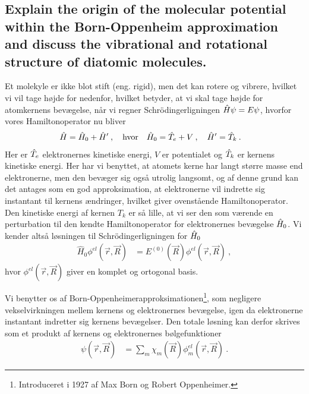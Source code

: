 \subsection{Explain the origin of the molecular potential within the Born-Oppenheim approximation and discuss the vibrational and rotational structure of diatomic molecules.}


Et molekyle er ikke blot stift (eng. rigid), men det kan rotere og vibrere, hvilket vi vil tage højde for nedenfor, hvilket betyder, at vi skal tage højde for atomkernens bevægelse, når vi regner Schrödingerligningen $\Hat{H}\psi = E \psi$, hvorfor vores Hamiltonoperator nu bliver
\begin{align}
    \Hat{H} &= \Hat{H}_0 + \Hat{H}' \: , \quad \text{hvor} \quad \Hat{H}_0 = \Hat{T}_e + V \: , \quad \Hat{H}' = \Hat{T}_k \: .
\end{align}
Her er $\Hat{T}_e$ elektronernes kinetiske energi, $V$ er potentialet og $\Hat{T}_k$ er kernens kinetiske energi. Her har vi benyttet, at atomets kerne har langt større masse end elektronerne, men den bevæger sig også utrolig langsomt, og af denne grund kan det antages som en god approksimation, at elektronerne vil indrette sig instantant til kernens ændringer, hvilket giver ovenstående Hamiltonoperator. Den kinetiske energi af kernen $T_k$ er så lille, at vi ser den som værende en perturbation til den kendte Hamiltonoperator for elektronernes bevægelse $\Hat{H}_0$.
Vi kender altså løsningen til Schrödingerligningen for $\Hat{H}_0$
\begin{align}
    \hat{H}_0\phi^{el}(\Vec{r}, \Vec{R}) &= E^{(0)}(\Vec{R})\phi^{el}(\Vec{r}, \Vec{R}) \: ,
\end{align}
hvor $\phi^{el}(\Vec{r},\Vec{R})$ giver en komplet og ortogonal basis.

Vi benytter os af \textsf{Born-Oppenheimerapproksimationen}\footnote{Introduceret i 1927 af Max Born og Robert Oppenheimer.}, som negligere vekselvirkningen mellem kernens og elektronernes bevægelse, igen da elektronerne instantant indretter sig kernens bevægelser. Den totale løsning kan derfor skrives som et produkt af kernens og elektronernes bølgefunktioner
\begin{align}
    \psi(\Vec{r}, \Vec{R}) &= \sum_m \chi_m(\Vec{R}) \phi_m^{el}(\Vec{r}, \Vec{R}) \: .
\end{align}

